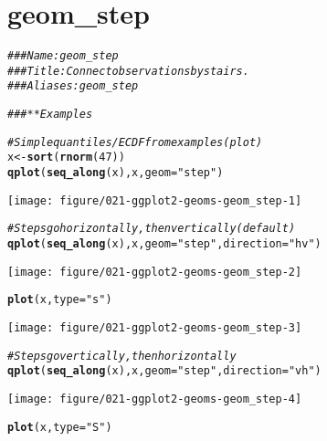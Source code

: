 \documentclass[a4paper,titlepage]{tufte-handout}\usepackage[]{graphicx}\usepackage[]{color}
\makeatletter
\def\maxwidth{ %
  \ifdim\Gin@nat@width>\linewidth
    \linewidth
  \else
    \Gin@nat@width
  \fi
}
\newcommand{\hlnum}[1]{\textcolor[rgb]{0.686,0.059,0.569}{#1}}%
\newcommand{\hlstr}[1]{\textcolor[rgb]{0.192,0.494,0.8}{#1}}%
\newcommand{\hlcom}[1]{\textcolor[rgb]{0.678,0.584,0.686}{\textit{#1}}}%
\newcommand{\hlstd}[1]{\textcolor[rgb]{0.345,0.345,0.345}{#1}}%
\newcommand{\hlkwb}[1]{\textcolor[rgb]{0.69,0.353,0.396}{#1}}%
\newcommand{\hlkwc}[1]{\textcolor[rgb]{0.333,0.667,0.333}{#1}}%
\newcommand{\hlkwd}[1]{\textcolor[rgb]{0.737,0.353,0.396}{\textbf{#1}}}%
\newenvironment{kframe}{%
 \def\at@end@of@kframe{}%
 \ifinner\ifhmode%
  \def\at@end@of@kframe{\end{minipage}}%
  \begin{minipage}{\columnwidth}%
 \fi\fi%
 \def\FrameCommand##1{\hskip\@totalleftmargin \hskip-\fboxsep
 \colorbox{shadecolor}{##1}\hskip-\fboxsep
     \hskip-\linewidth \hskip-\@totalleftmargin \hskip\columnwidth}%
 \MakeFramed {\advance\hsize-\width
   \@totalleftmargin\z@ \linewidth\hsize
   \@setminipage}}%
 {\par\unskip\endMakeFramed%
 \at@end@of@kframe}
\newenvironment{knitrout}{}{} %
\makeatother
\begin{document}
\section{geom\_step}

\begin{knitrout}
\color{fgcolor}\begin{kframe}
\begin{alltt}
\hlcom{### Name: geom_step}
\hlcom{### Title: Connect observations by stairs.}
\hlcom{### Aliases: geom_step}

\hlcom{### ** Examples}

\hlcom{# Simple quantiles/ECDF from examples(plot)}
\hlstd{x} \hlkwb{<-} \hlkwd{sort}\hlstd{(}\hlkwd{rnorm}\hlstd{(}\hlnum{47}\hlstd{))}
\hlkwd{qplot}\hlstd{(}\hlkwd{seq_along}\hlstd{(x), x,} \hlkwc{geom}\hlstd{=}\hlstr{"step"}\hlstd{)}
\end{alltt}
\end{kframe}
\texttt{[image: figure/021-ggplot2-geoms-geom\_step-1]} 
\begin{kframe}\begin{alltt}
\hlcom{# Steps go horizontally, then vertically (default)}
\hlkwd{qplot}\hlstd{(}\hlkwd{seq_along}\hlstd{(x), x,} \hlkwc{geom}\hlstd{=}\hlstr{"step"}\hlstd{,} \hlkwc{direction} \hlstd{=} \hlstr{"hv"}\hlstd{)}
\end{alltt}
\end{kframe}
\texttt{[image: figure/021-ggplot2-geoms-geom\_step-2]} 
\begin{kframe}\begin{alltt}
\hlkwd{plot}\hlstd{(x,} \hlkwc{type} \hlstd{=} \hlstr{"s"}\hlstd{)}
\end{alltt}
\end{kframe}
\texttt{[image: figure/021-ggplot2-geoms-geom\_step-3]} 
\begin{kframe}\begin{alltt}
\hlcom{# Steps go vertically, then horizontally}
\hlkwd{qplot}\hlstd{(}\hlkwd{seq_along}\hlstd{(x), x,} \hlkwc{geom}\hlstd{=}\hlstr{"step"}\hlstd{,} \hlkwc{direction} \hlstd{=} \hlstr{"vh"}\hlstd{)}
\end{alltt}
\end{kframe}
\texttt{[image: figure/021-ggplot2-geoms-geom\_step-4]} 
\begin{kframe}\begin{alltt}
\hlkwd{plot}\hlstd{(x,} \hlkwc{type} \hlstd{=} \hlstr{"S"}\hlstd{)}
\end{alltt}

\end{kframe}
\end{knitrout}
\end{document}
